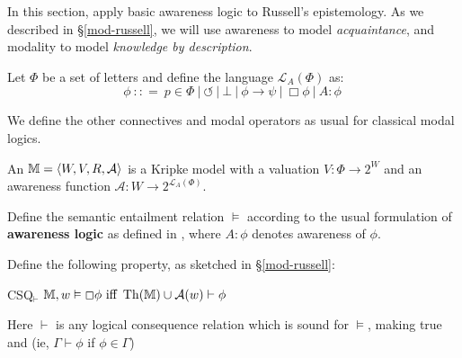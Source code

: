 In this section, apply basic awareness logic to Russell's
epistemology.  As we described in \S\ref{mod-russell}, we will use
awareness to model \emph{acquaintance}, and modality to model \emph{knowledge by description}.

\begin{definition}
  Let $\Phi$ be a set of letters and define the language $\mathcal{L}_A
  (\Phi)$ as:
  \[ \phi \  : : = \  p \in \Phi \  |
     \  \circlearrowleft \  | \  \bot
     \  | \  \phi \rightarrow \psi \  |
     \  \Box \phi \  | \  A : \phi \ 
  \]
\end{definition}

We define the other connectives and modal operators as usual for classical
modal logics.

\begin{definition}
  \label{awarenessmodels0}An {} $\mathbbm{M}= \langle
  W, V, R, \mathcal{A} \rangle$ is a Kripke model with a valuation $V : \Phi \rightarrow 2^W$ and an awareness function
  $\mathcal{A} : W \rightarrow 2^{\mathcal{L}_A (\Phi)}$.
  
  Define the semantic entailment relation $\vDash$ according to the
  usual formulation of
  \textbf{awareness logic} as defined in \cite{fagin_belief_1988},
  where $A : \phi$ denotes awareness of $\phi$. 
\end{definition}

Define the following property, as sketched in \S\ref{mod-russell}:

\begin{definition}\label{csq0}
  \begin{descriptiondash}
    \item[CSQ$_\vdash$] $\mathbbm{M}, w \vDash \Box \phi \text{ iff } \tmop{Th}
    (\mathbbm{M}) \cup \mathcal{A}(w) \vdash \phi$
  \end{descriptiondash}
  
  Here $\vdash$ is any logical consequence relation which is sound for
  $\vDash$, making true \tmtextbf{modus ponens} and  (ie,
  $\Gamma \vdash \phi$ if $\phi \in \Gamma$)
\end{definition}


